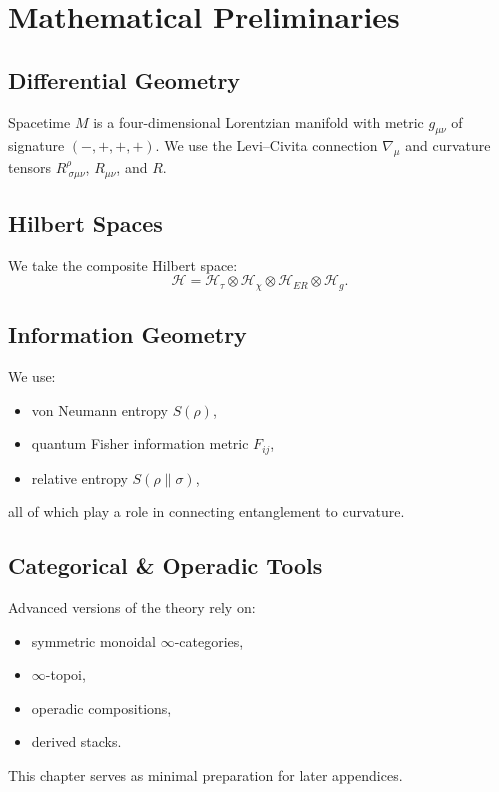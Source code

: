 \chapter{Mathematical Preliminaries}

\section{Differential Geometry}

Spacetime $M$ is a four-dimensional Lorentzian manifold with metric $g_{\mu\nu}$ of signature $(-,+,+,+)$. 
We use the Levi--Civita connection $\nabla_\mu$ and curvature tensors $R^\rho_{~\sigma\mu\nu}$, $R_{\mu\nu}$, and $R$.

\section{Hilbert Spaces}

We take the composite Hilbert space:
\[
\mathcal{H} = \mathcal{H}_\tau \otimes \mathcal{H}_\chi \otimes \mathcal{H}_{ER} \otimes \mathcal{H}_g.
\]

\section{Information Geometry}

We use:

\begin{itemize}
  \item von Neumann entropy $S(\rho)$,
  \item quantum Fisher information metric $F_{ij}$,
  \item relative entropy $S(\rho\|\sigma)$,
\end{itemize}

all of which play a role in connecting entanglement to curvature.

\section{Categorical \& Operadic Tools}

Advanced versions of the theory rely on:

\begin{itemize}
  \item symmetric monoidal $\infty$-categories,
  \item $\infty$-topoi,
  \item operadic compositions,
  \item derived stacks.
\end{itemize}

This chapter serves as minimal preparation for later appendices.

